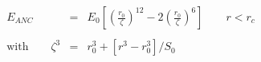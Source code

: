 


\begin{eqnarray*}
 E_{ANC} & = & 
E_{0}
\left[ 
   \left(\frac{ r_{0} }{ \zeta }\right)^{12}-2
   \left(\frac{ r_{0} }{ \zeta }\right)^{6}
\right] 
\qquad r < r_c \\
& & \\
 \mathrm{with} \qquad \zeta^{3} & = & r_{0}^3 + \left[ {r^3  - r_{0}^3} \right] / S_{0} 
\end{eqnarray*}



